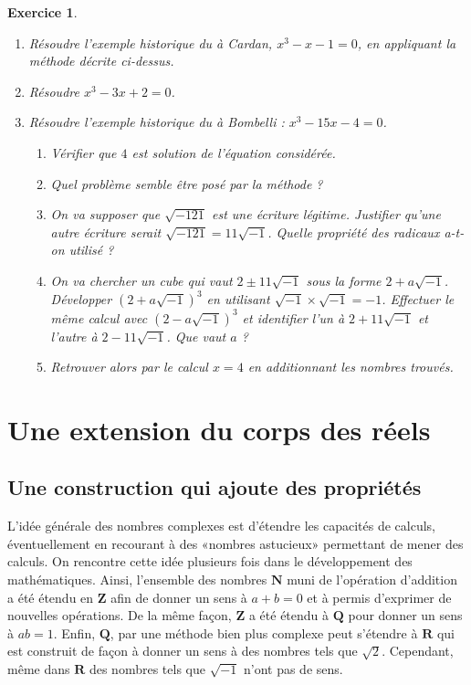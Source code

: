 \documentclass[11pt,a4paper,french]{article}
\makeatletter
\renewcommand{\maketitle}%
{\framebox{%
    \begin{minipage}{1.0\linewidth}%
      \begin{center}%
        \Large \@title ~-- \@author \\%
        \@date%
      \end{center}%
    \end{minipage}}%
  \normalsize%
}
\newcommand{\R}{\mathbf{R}}
\newcommand{\Q}{\mathbf{Q}}
\newcommand{\Z}{\mathbf{Z}}
\newcommand{\N}{\mathbf{N}}
\theoremstyle{break}
\theoremstyle{plain}
\newtheorem{exerciceT}{Exercice}
\theoremstyle{nonumberplain}
\theoremstyle{nonumberbreak}
\newenvironment{exercice}{\begin{framed}\begin{exerciceT}}{\end{exerciceT}\end{framed}}
\makeatother
\begin{document}
\begin{exercice}
  \begin{enumerate}
    \item Résoudre l'exemple historique du à Cardan, $x^3 -x -1 =0$, en
      appliquant la méthode décrite ci-dessus.
    \item Résoudre $x^3 -3x + 2 =0$.
    \item Résoudre l'exemple historique du à Bombelli : $x^3 - 15x -4 =
      0$.
      \begin{enumerate}
        \item Vérifier que $4$ est solution de l'équation considérée.
        \item Quel problème semble être posé par la méthode ?
        \item On va supposer que $\sqrt{-121}$ est une écriture
          légitime. Justifier qu'une autre écriture serait $\sqrt{-121}
          = 11\sqrt{-1}$. Quelle propriété des radicaux a-t-on utilisé ?
        \item On va chercher un cube qui vaut $2 \pm 11\sqrt{-1}$ sous
          la forme $2 + a\sqrt{-1}$. Développer $(2+a\sqrt{-1})^3$ en
          utilisant $\sqrt{-1}\times \sqrt{-1} = -1$. Effectuer le même
          calcul avec $(2-a\sqrt{-1})^3$ et identifier l'un à $2 +
          11\sqrt{-1}$ et l'autre à $2 - 11\sqrt{-1}$. Que vaut $a$ ?
        \item Retrouver alors par le calcul $x = 4$ en additionnant les
          nombres trouvés.
      \end{enumerate}
  \end{enumerate}
\end{exercice}

\pagebreak

\noindent\maketitle

\section{Une extension du corps des réels}

\subsection{Une construction qui ajoute des propriétés}

L'idée générale des nombres complexes est d'étendre les capacités de
calculs, éventuellement en recourant à des «nombres astucieux»
permettant de mener des calculs. On rencontre cette idée plusieurs fois
dans le développement des mathématiques. Ainsi, l'ensemble des nombres
$\N$ muni de l'opération d'addition a été étendu en $\Z$ afin de donner
un sens à $a+b =0$ et à permis d'exprimer de nouvelles opérations. De la
même façon, $\Z$ a été étendu à $\Q$ pour donner un sens à $ab = 1$.
Enfin, $\Q$, par une méthode bien plus complexe peut s'étendre à $\R$
qui est construit de façon à donner un sens à des nombres tels que
$\sqrt{2}$. Cependant, même dans $\R$ des nombres tels que $\sqrt{-1}$
n'ont pas de sens.
\end{document}
